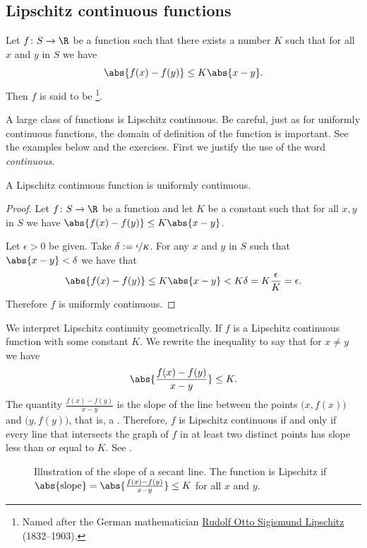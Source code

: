 \documentclass[12pt]{book}
\begin{document}
\subsection*{Lipschitz continuous functions}

\begin{defn}
Let $f \colon S \to \R$ be a function such that there exists a number $K$
such that for all $x$ and $y$ in $S$ we have
\begin{equation*}
\abs{f(x)-f(y)} \leq K \abs{x-y} .
\end{equation*}
Then $f$ is said to be \emph{}%
\footnote{Named after the German mathematician
\href{http://en.wikipedia.org/wiki/Rudolf_Lipschitz}{Rudolf Otto Sigismund Lipschitz}
(1832--1903).}.
\end{defn}

A large class of functions is Lipschitz continuous.
Be careful, just as
for uniformly continuous functions, the
domain of definition of the function is important.
See the examples below
and the exercises.
First we justify the use of the word \emph{continuous}.

\begin{prop}
A Lipschitz continuous function is uniformly continuous.
\end{prop}

\begin{proof}
Let $f \colon S \to \R$ be a function and let $K$ be a constant such that
for all $x, y$ in $S$ we have
$\abs{f(x)-f(y)} \leq K \abs{x-y}$.

Let $\epsilon > 0$ be given.
Take $\delta :=
\nicefrac{\epsilon}{K}$.
For any $x$ and $y$ in $S$ such that
$\abs{x-y} < \delta$
we have that
\begin{equation*}
\abs{f(x)-f(y)} \leq K \abs{x-y} < K \delta = K \frac{\epsilon}{K} =
\epsilon .
\end{equation*}
Therefore $f$ is uniformly continuous.
\end{proof}

We interpret Lipschitz continuity geometrically.
If $f$ is a Lipschitz
continuous function with some constant $K$.
We rewrite the inequality 
to say that for $x \not=y$ we have
\begin{equation*}
\abs{\frac{f(x)-f(y)}{x-y}} \leq K .
\end{equation*}
The quantity $\frac{f(x)-f(y)}{x-y}$ is the slope of the line
between the points $\bigl(x,f(x)\bigr)$
and $\bigl(y,f(y)\bigr)$, that is, a \emph{}.
Therefore, $f$ is Lipschitz
continuous if and only if every line that intersects the graph of $f$ in at least two
distinct
points has slope less than or equal to $K$.
See .
\begin{figure}[h!t]
\begin{center}

\caption{Illustration of the slope of a secant line.
The function is Lipschitz if $\abs{\text{slope}} =
\abs{\frac{f(x)-f(y)}{x-y}} \leq K$ for all $x$ and $y$.\label{fig:lipschitz}}
\end{center}
\end{figure}
\end{document}
